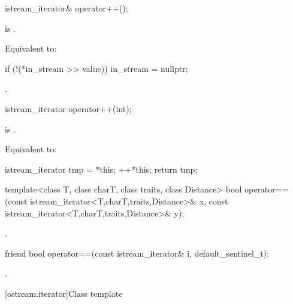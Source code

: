 %
\begin{itemdecl}
istream_iterator& operator++();
\end{itemdecl}

\begin{itemdescr}
\pnum
\expects
{} is .

\pnum
\effects
Equivalent to:
\begin{codeblock}
if (!(*in_stream >> value))
  in_stream = nullptr;
\end{codeblock}

\pnum
\returns
{}.
\end{itemdescr}

%
\begin{itemdecl}
istream_iterator operator++(int);
\end{itemdecl}

\begin{itemdescr}
\pnum
\expects
{} is .

\pnum
\effects
Equivalent to:
\begin{codeblock}
istream_iterator tmp = *this;
++*this;
return tmp;
\end{codeblock}
\end{itemdescr}

%
\begin{itemdecl}
template<class T, class charT, class traits, class Distance>
  bool operator==(const istream_iterator<T,charT,traits,Distance>& x,
                  const istream_iterator<T,charT,traits,Distance>& y);
\end{itemdecl}

\begin{itemdescr}
\pnum
\returns
{}.
\end{itemdescr}

%
\begin{itemdecl}
friend bool operator==(const istream_iterator& i, default_sentinel_t);
\end{itemdecl}

\begin{itemdescr}
\pnum
\returns
{}.
\end{itemdescr}

[ostream.iterator]{Class template }


